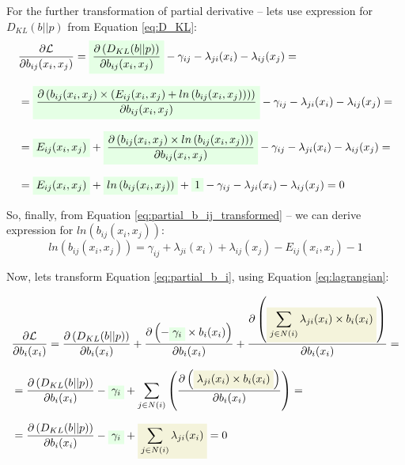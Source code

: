\documentclass[fleqn,leqno]{article}
\newcommand{\highlight}[1]{\colorbox{green!10}{$\displaystyle#1$}}
\newcommand{\highlightred}[1]{\colorbox{olive!10}{$\displaystyle#1$}}
\begin{document}
For the further transformation of partial derivative -- lets use expression for $D_{KL}(b||p)$ from Equation \eqref{eq:D_KL}:
\begin{equation} \label{eq:partial_b_ij_transformed}
\setlength{\jot}{10pt}
\begin{split}
   & {\partial \mathcal{L} \over \partial b_{ij}(x_i,x_j)} = \highlight{ {\partial \left( D_{KL}(b||p) \right) \over \partial b_{ij}(x_i, x_j)} } - \gamma_{ij} - \lambda_{ji}(x_i) - \lambda_{ij}(x_j) = \\
   & = \highlight{ {\partial \left( b_{ij}(x_i, x_j) \times \left( E_{ij}(x_i, x_j) + ln \left( b_{ij}(x_i, x_j) \right) \right) \right) \over \partial b_{ij}(x_i, x_j)} } - \gamma_{ij} - \lambda_{ji}(x_i) - \lambda_{ij}(x_j) = \\
   & = \highlight{ E_{ij}(x_i, x_j) } + \highlight{ {\partial \left( b_{ij}(x_i, x_j) \times ln \left( b_{ij}(x_i, x_j) \right) \right) \over \partial b_{ij}(x_i, x_j)} } - \gamma_{ij} - \lambda_{ji}(x_i) - \lambda_{ij}(x_j) = \\
   & = \highlight{ E_{ij}(x_i, x_j) } + \highlight{ ln \left( b_{ij}(x_i, x_j) \right) } + \highlight{ 1 } - \gamma_{ij} - \lambda_{ji}(x_i) - \lambda_{ij}(x_j) = 0
\end{split}
\end{equation}

So, finally, from Equation \eqref{eq:partial_b_ij_transformed} -- we can derive expression for $ln \left( b_{ij}(x_i, x_j) \right)$:
\begin{equation} \label{eq:ln_b_ij}
   ln \left( b_{ij}(x_i, x_j) \right) = \gamma_{ij} + \lambda_{ji}(x_i) + \lambda_{ij}(x_j) - E_{ij}(x_i, x_j) - 1
\end{equation}

Now, lets transform Equation \eqref{eq:partial_b_i}, using Equation \eqref{eq:lagrangian}:

\begin{equation}
\setlength{\jot}{10pt}
\begin{split}
   & {\partial \mathcal{L} \over \partial b_i(x_i)} = {\partial \left( D_{KL}(b||p) \right) \over \partial b_i(x_i)} + {\partial \left( -\highlight{ \gamma_i } \times b_i(x_i) \right) \over \partial b_i(x_i)} + {\partial \left( \highlightred{ \sum_{j \in N(i)} \lambda_{ji}(x_i) \times b_i(x_i) } \right) \over \partial b_i(x_i)} = \\
   & = {\partial \left( D_{KL}(b||p) \right) \over \partial b_i(x_i)} -\highlight{ \gamma_i } + \sum_{j \in N(i)} \left( {\partial \left( \highlightred{ \lambda_{ji}(x_i) \times b_i(x_i) } \right) \over \partial b_i(x_i)} \right) = \\
   & = {\partial \left( D_{KL}(b||p) \right) \over \partial b_i(x_i)} -\highlight{ \gamma_i } + \highlightred{ \sum_{j \in N(i)} \lambda_{ji}(x_i) } = 0
\end{split}
\end{equation}
\end{document}

